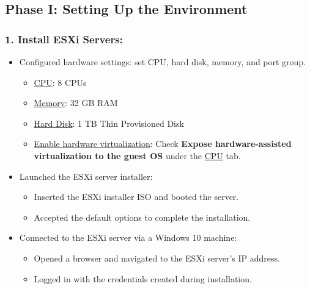 \documentclass[letterpaper,12pt]{article}
\begin{document}
\subsection{Phase I: Setting Up the Environment}
\label{sec:org43dc141}
\subsubsection{1. Install ESXi Servers:}
\label{sec:org829ef12}
\begin{itemize}
\item Configured hardware settings: set CPU, hard disk, memory, and port group.
\begin{itemize}
\item \uline{CPU}: 8 CPUs
\item \uline{Memory}: 32 GB RAM
\item \uline{Hard Disk}: 1 TB Thin Provisioned Disk
\item \uline{Enable hardware virtualization}: Check \textbf{Expose hardware-assisted virtualization to the guest OS} under the \uline{CPU} tab.
\end{itemize}
\item Launched the ESXi server installer:
\begin{itemize}
\item Inserted the ESXi installer ISO and booted the server.
\item Accepted the default options to complete the installation.
\end{itemize}
\item Connected to the ESXi server via a Windows 10 machine:
\begin{itemize}
\item Opened a browser and navigated to the ESXi server's IP address.
\item Logged in with the credentials created during installation.
\end{itemize}
\end{itemize}
\end{document}
